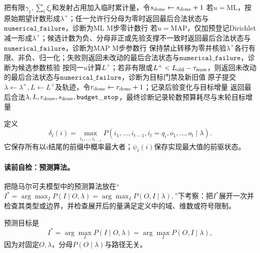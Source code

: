 \begin{AlgorithmContract}
\begin{algorithm}[H]
{{    把有限$\gamma_1,\sum_t\xi_t$和发射占用加入临时累计量，令$s_{\rm done}\leftarrow s_{\rm done}+1$\;
  }
  若$u=\mathrm{ML}$，按原始期望计数形成$\lambda^+$；任一允许行分母为零时返回最后合法状态与$\mathtt{numerical\_failure}$，诊断为ML M步零计数行\;
  若$u=\mathrm{MAP}$，仅加预登记Dirichlet减一形成$\lambda^+$；候选计数为负、分母非正或先验支撑不一致时返回最后合法状态与$\mathtt{numerical\_failure}$，诊断为MAP M步参数行\;
  保持禁止转移为零并核验$\lambda^+$各行有限、非负、归一化；失败则返回未改动的最后合法状态与$\mathtt{numerical\_failure}$，诊断为候选参数核验\;
  按同一$u$计算$L^+$；若非有限或$L^+<L_{\rm old}-\tau_{\rm num}$，则返回未改动的最后合法状态与$\mathtt{numerical\_failure}$，诊断为目标门禁及新旧值\;
  原子提交$\lambda\leftarrow\lambda^+,L\leftarrow L^+$及轨迹，令$r_{\rm done}\leftarrow r_{\rm done}+1$；记录后验变化与目标增量\;
}
返回最后合法$\lambda,L,r_{\rm done},s_{\rm done},\mathtt{budget\_stop}$，最终诊断记录轮数预算耗尽与末轮目标增量\;
\end{algorithm}
\end{AlgorithmContract}


定义
\[
\delta_t(i)=\max_{i_1,\ldots,i_{t-1}}
P(i_1,\ldots,i_{t-1},i_t=q_i,o_1,\ldots,o_t\mid\lambda).
\]
它保存所有以$i$结尾的前缀中概率最大者；$\psi_t(i)$保存实现最大值的前驱状态。

\paragraph{读前自检：预测算法。}把隐马尔可夫模型中的预测算法放在“$I^*=\arg\max_I P(I\mid O,\lambda) =\arg\max_I P(O,I\mid\lambda),$”下考察：把$I^*$展开一次并检查其类型或边界，并检查展开后的量满足定义中的域、维数或符号限制。\par

预测目标是
\[
I^*=\arg\max_I P(I\mid O,\lambda)
=\arg\max_I P(O,I\mid\lambda),
\]
因为对固定$O,\lambda$，分母$P(O\mid\lambda)$与路径无关。


